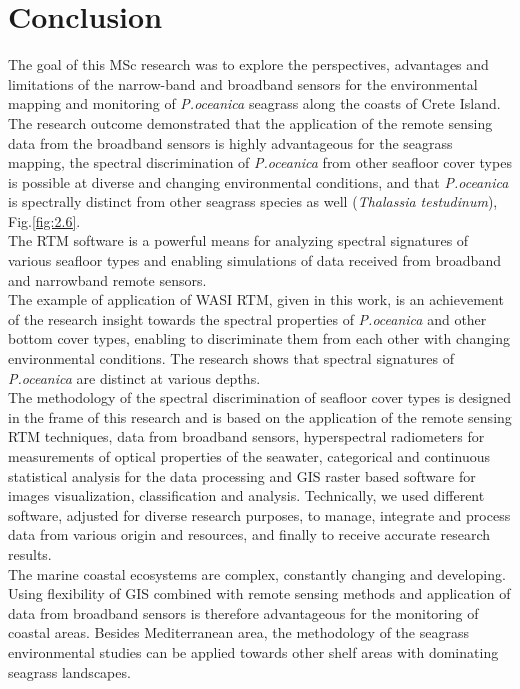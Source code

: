 \documentclass[11pt]{article}
\begin{document}
\section{Conclusion}\label{sec:6}
The goal of this MSc research was to explore the perspectives, advantages and limitations of the narrow-band and broadband sensors for the environmental mapping and monitoring of \textit{P.oceanica} seagrass along the coasts of Crete Island. The research outcome demonstrated that the application of the remote sensing data from the broadband sensors is highly advantageous for the seagrass mapping, the spectral discrimination of \textit{P.oceanica} from other seafloor cover types is possible at diverse and changing environmental conditions, and that \textit{P.oceanica} is spectrally distinct from other seagrass species as well (\textit{Thalassia testudinum}), Fig.\ref{fig:2.6}\label{page-54}.\vspace{1ex}\\
The \ac{RTM} software is a powerful means for analyzing spectral signatures of various seafloor types and enabling simulations of data received from broadband and narrowband remote sensors.\\ The example of application of \ac{WASI} \ac{RTM}, given in this work, is an achievement of the research insight towards the spectral properties of \textit{P.oceanica} and other bottom cover types, enabling to discriminate them from each other with changing environmental conditions. The research shows that spectral signatures of \textit{P.oceanica} are distinct at various depths.\vspace{1ex}\\
The methodology of the spectral discrimination of seafloor cover types is designed in the frame of this research and is based on the application of the remote sensing \ac{RTM} techniques, data from broadband sensors, hyperspectral radiometers for measurements of optical properties of the seawater, categorical and continuous statistical analysis for the data processing and \ac{GIS} raster based software for images visualization, classification and analysis. Technically, we used different software, adjusted for diverse research purposes, to manage, integrate and process data from various origin and resources, and finally to receive  accurate research results.\vspace{1ex}\\
The marine coastal ecosystems are complex, constantly changing and developing. Using flexibility of \ac{GIS} combined with remote sensing methods and application of data from broadband sensors is therefore advantageous for the monitoring of coastal areas. Besides Mediterranean area, the methodology of the seagrass environmental studies can be applied towards other shelf areas with dominating seagrass landscapes.\vspace{1ex}\\
\end{document}
